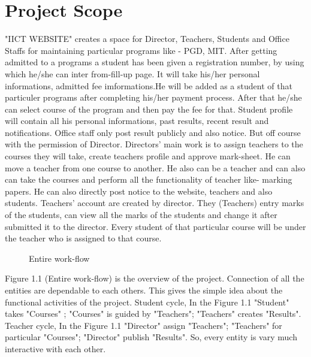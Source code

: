 \documentclass{scrreprt}
\begin{document}
    \section{Project Scope}
    "IICT WEBSITE" creates a space for Director, Teachers, Students and Office Staffs for maintaining particular programs like - PGD, MIT. 
    \newline
    After getting admitted to a programs a student has been given a registration number, by using which he/she can inter from-fill-up page. It will take his/her personal informations, admitted fee imformations.He will be added as a student of that particuler programs after completing his/her payment process. After that he/she can select course of the program and then pay the fee for that. Student profile will contain all his personal informations, past results, recent result and notifications.
    \newline
    Office staff only post result publicly and also notice. But off course with the permission of Director.  
    \newline
    Directors' main work is to assign teachers to the courses they will take, create teachers profile and approve mark-sheet. He can move a teacher from one course to another. He also can be a teacher and can also can take the courses and perform all the functionality of teacher like- marking papers. He can also directly post notice to the website, teachers and also students.
    \newline
    Teachers' account are created by director. They (Teachers) entry marks of the students, can view all the marks of the students and change it after submitted it to the director. Every student of that particular course will be under the teacher who is assigned to that course. 
    \newline
    \begin{figure}
        \centering 
        \caption{Entire work-flow}
        \label{fig:IICT WEBSITE}
    \end{figure}
    \newline
    Figure 1.1 (Entire work-flow) is the overview of the project. Connection of all the entities are dependable to each others.  This gives the simple idea about the functional activities of the project. 
    \newline
    Student cycle, In the Figure 1.1 "Student" takes "Courses" ; "Courses" is guided by "Teachers"; "Teachers" creates "Results". 
    \newline
    Teacher cycle, In the Figure 1.1 "Director" assign "Teachers"; "Teachers" for particular "Courses"; "Director" publish "Results".
    \newline
    So, every entity is vary much interactive with each other.
\end{document}
